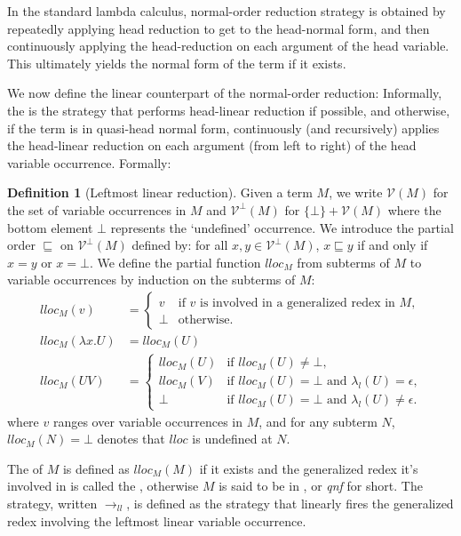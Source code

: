 \documentclass{elsarticle}
\theoremstyle{plain}
\theoremstyle{definition}
\newtheorem{definition}{Definition}[section]
\theoremstyle{remark}
\newcommand\VarSet{\mathcal{V}}
\newcommand{\llred}{\rightarrow_{ll}}
\begin{document}
In the standard lambda calculus, normal-order reduction strategy is obtained by repeatedly applying head reduction to get to the head-normal form, and then continuously applying the head-reduction on each argument of the head variable.
This ultimately yields the normal form of the term if it exists.

We now define the linear counterpart of the normal-order reduction: Informally, the  is the strategy that performs head-linear reduction if possible, and otherwise, if the term is in quasi-head normal form, continuously (and recursively) applies the head-linear reduction on each argument (from left to right) of the head variable occurrence.
Formally:

\begin{definition}[Leftmost linear reduction]
    \label{def:leftmostlinearreduction}
Given a term $M$, we write $\VarSet(M)$ for the set of variable occurrences in $M$
and $\VarSet^\bot(M)$ for $\{\bot \} + \VarSet(M)$ where the bottom element $\bot$ represents the `undefined' occurrence. We introduce the partial order $\sqsubseteq$ on $\VarSet^\bot(M)$ defined by: for all $x,y \in \VarSet^\bot(M)$, $x \sqsubseteq y$ if and only if $x = y$ or $x = \bot$. We define the partial function $lloc_M$ from subterms of $M$ to variable occurrences by induction on the subterms of $M$:
\begin{align*}
lloc_M(v) &=
    \begin{cases}
    v &\mbox{if $v$ is involved in a generalized redex in $M$,} \\
    \bot & \mbox {otherwise.}
    \end{cases}  \\
lloc_M(\lambda x . U) &= lloc_M(U) \\
lloc_M(U V) &= \begin{cases}
                lloc_M(U) &\mbox{if $lloc_M(U)\neq\bot$,} \\
                lloc_M(V) &\mbox{if $lloc_M(U)=\bot$ and $\lambda_l(U) = \epsilon$,} \\
                \bot & \mbox{if $lloc_M(U)=\bot$ and $\lambda_l(U) \neq \epsilon$.}
              \end{cases}
\end{align*}
where $v$ ranges over variable occurrences in $M$,
and for any subterm $N$, $lloc_M(N) = \bot$ denotes that $lloc$ is undefined at $N$.

The  of $M$
is defined as $lloc_M(M)$ if it exists and the generalized redex it's involved in is called the , otherwise $M$ is said to be in , or \emph{qnf} for short.
The  strategy, written $\llred$, is defined as the strategy that linearly fires the generalized redex involving the leftmost linear variable occurrence.
\end{definition}
\end{document}

